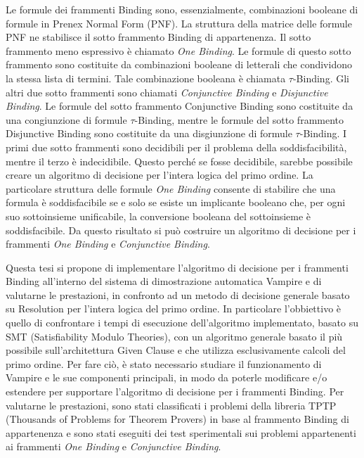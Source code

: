 \documentclass[./main.tex]{subfiles}
\begin{document}
Le formule dei frammenti Binding sono, essenzialmente, combinazioni booleane di formule in Prenex Normal Form (PNF).
La struttura della matrice delle formule PNF ne stabilisce il sotto frammento Binding di appartenenza.
Il sotto frammento meno espressivo è chiamato \textit{One Binding}.
Le formule di questo sotto frammento sono costituite da combinazioni booleane di 
letterali che condividono la stessa lista di termini. 
Tale combinazione booleana è chiamata $\tau$-Binding.
Gli altri due sotto frammenti sono chiamati \textit{Conjunctive Binding} e \textit{Disjunctive Binding}.
Le formule del sotto frammento Conjunctive Binding sono costituite da una congiunzione di formule $\tau$-Binding,
mentre le formule del sotto frammento Disjunctive Binding sono costituite da una disgiunzione di formule $\tau$-Binding.
I primi due sotto frammenti sono decidibili per il problema della soddisfacibilità, mentre il terzo è indecidibile.
Questo perché se fosse decidibile, sarebbe possibile creare un algoritmo di decisione per l'intera logica del primo ordine.
La particolare struttura delle formule \textit{One Binding} consente di stabilire che 
una formula è soddisfacibile se e solo se esiste un implicante booleano che, per ogni suo sottoinsieme unificabile,
la conversione booleana del sottoinsieme è soddisfacibile.
Da questo risultato si può costruire un algoritmo di decisione per i frammenti \textit{One Binding} e \textit{Conjunctive Binding}.

% 

Questa tesi si propone di implementare l'algoritmo di decisione per i frammenti Binding
all'interno del sistema di dimostrazione automatica Vampire 
e di valutarne le prestazioni, in confronto ad un metodo di decisione generale
basato su Resolution per l'intera logica del primo ordine.
In particolare l'obbiettivo è quello di confrontare i tempi di esecuzione 
dell'algoritmo implementato, basato su SMT (Satisfiability Modulo Theories),
con un algoritmo generale basato il più possibile sull'architettura Given Clause e che utilizza 
esclusivamente calcoli del primo ordine.
Per fare ciò, è stato necessario studiare il funzionamento di Vampire e le sue componenti principali,
in modo da poterle modificare e/o estendere per supportare l'algoritmo di decisione per i frammenti Binding.
Per valutarne le prestazioni, sono stati classificati i problemi della libreria TPTP (Thousands of Problems for Theorem Provers)
in base al frammento Binding di appartenenza e sono stati eseguiti dei test sperimentali sui problemi
appartenenti ai frammenti \textit{One Binding} e \textit{Conjunctive Binding}.
\end{document}
